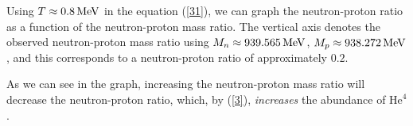 \documentclass{lkx_pset}
\begin{document}
\begin{solution}
	Using $T\approx\MeVsi{0.8}$ in the equation (\ref{31}), we can graph the neutron-proton ratio as a function of the neutron-proton mass ratio. The vertical axis denotes the observed neutron-proton mass ratio using $M_n \approx \MeVsi{939.565}$, $M_p\approx \MeVsi{938.272}$, and this corresponds to a neutron-proton ratio of approximately $0.2$.
  \begin{center}
  \end{center}
  As we can see in the graph, increasing the neutron-proton mass ratio will decrease the neutron-proton ratio, which, by (\ref{3}), \emph{increases} the abundance of $\mathrm{He}^4$.
\end{solution}
\end{document}
